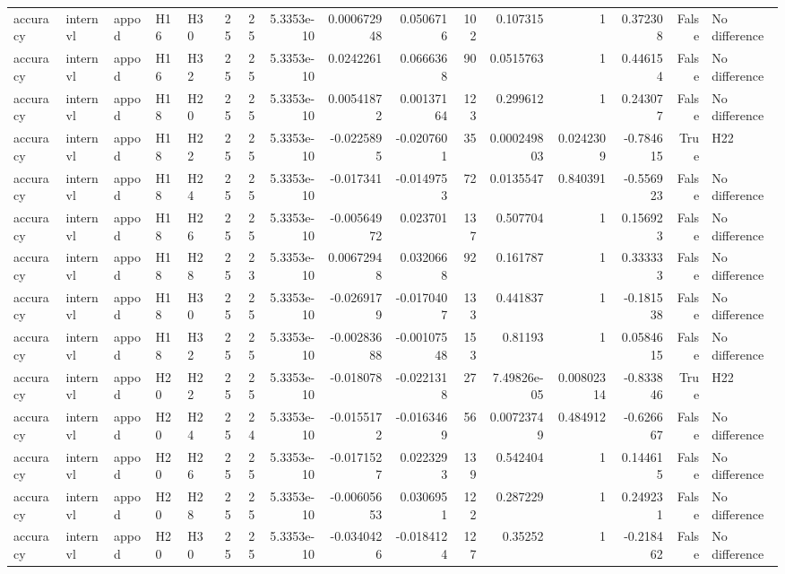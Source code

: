 \begin{longtable}{lllllrrrrrrrrrrl}
accuracy & internvl & appod & H16 & H30 & 25 & 25 & 5.3353e-10 & 0.000672948 & 0.0506716 & 102 & 0.107315 & 1 & 0.372308 & False & No difference \\
accuracy & internvl & appod & H16 & H32 & 25 & 25 & 5.3353e-10 & 0.0242261 & 0.0666368 & 90 & 0.0515763 & 1 & 0.446154 & False & No difference \\
accuracy & internvl & appod & H18 & H20 & 25 & 25 & 5.3353e-10 & 0.00541872 & 0.00137164 & 123 & 0.299612 & 1 & 0.243077 & False & No difference \\
accuracy & internvl & appod & H18 & H22 & 25 & 25 & 5.3353e-10 & -0.0225895 & -0.0207601 & 35 & 0.000249803 & 0.0242309 & -0.784615 & True & H22 \\
accuracy & internvl & appod & H18 & H24 & 25 & 25 & 5.3353e-10 & -0.017341 & -0.0149753 & 72 & 0.0135547 & 0.840391 & -0.556923 & False & No difference \\
accuracy & internvl & appod & H18 & H26 & 25 & 25 & 5.3353e-10 & -0.00564972 & 0.023701 & 137 & 0.507704 & 1 & 0.156923 & False & No difference \\
accuracy & internvl & appod & H18 & H28 & 25 & 23 & 5.3353e-10 & 0.00672948 & 0.0320668 & 92 & 0.161787 & 1 & 0.333333 & False & No difference \\
accuracy & internvl & appod & H18 & H30 & 25 & 25 & 5.3353e-10 & -0.0269179 & -0.0170407 & 133 & 0.441837 & 1 & -0.181538 & False & No difference \\
accuracy & internvl & appod & H18 & H32 & 25 & 25 & 5.3353e-10 & -0.00283688 & -0.00107548 & 153 & 0.81193 & 1 & 0.0584615 & False & No difference \\
accuracy & internvl & appod & H20 & H22 & 25 & 25 & 5.3353e-10 & -0.018078 & -0.0221318 & 27 & 7.49826e-05 & 0.00802314 & -0.833846 & True & H22 \\
accuracy & internvl & appod & H20 & H24 & 25 & 24 & 5.3353e-10 & -0.0155172 & -0.0163469 & 56 & 0.00723749 & 0.484912 & -0.626667 & False & No difference \\
accuracy & internvl & appod & H20 & H26 & 25 & 25 & 5.3353e-10 & -0.0171527 & 0.0223293 & 139 & 0.542404 & 1 & 0.144615 & False & No difference \\
accuracy & internvl & appod & H20 & H28 & 25 & 25 & 5.3353e-10 & -0.00605653 & 0.0306951 & 122 & 0.287229 & 1 & 0.249231 & False & No difference \\
accuracy & internvl & appod & H20 & H30 & 25 & 25 & 5.3353e-10 & -0.0340426 & -0.0184124 & 127 & 0.35252 & 1 & -0.218462 & False & No difference \\

\end{longtable}
